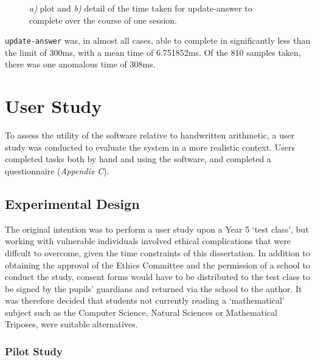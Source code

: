 \documentclass[12pt,twoside,notitlepage,xetex]{report}
\begin{document}
\begin{landscape}
\begin{center}
\begin{figure}[H]
\begin{center}
{}
\end{center}
\caption{\emph{a)} plot and \emph{b)} detail of the time taken for {\ttfamily update-answer} to complete over the course of one session.}
\label{fig:UpdateTimes}
\end{figure}
\end{center}
\end{landscape}

\newpage
\verb¬update-answer¬ was, in almost all cases, able to complete in significantly less than the limit of 300ms, with a mean time of 6.751852ms.  Of the 810 samples taken, there was one anomalous time of 308ms.

%
\section{User Study}

To assess the utility of the software relative to handwritten arithmetic, a user study was conducted to evaluate the system in a more realistic context.  Users completed tasks both by hand and using the software, and completed a questionnaire (\emph{Appendix C}).

\subsection{Experimental Design}

The original intention was to perform a user study upon a Year 5 `test class', but working with vulnerable individuals involved ethical complications that were diffcult to overcome, given the time constraints of this dissertation.  In addition to obtaining the approval of the Ethics Committee and the permission of a school to conduct the study, consent forms would have to be distributed to the test class to be signed by the pupils' guardians and returned via the school to the author.  It was therefore decided that students not currently reading a `mathematical' subject such as the Computer Science, Natural Sciences or Mathematical Triposes, were suitable alternatives.

\subsubsection{Pilot Study}
\end{document}
